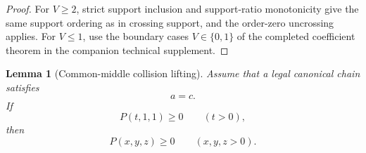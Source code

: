 \documentclass[11pt]{article}
\newtheorem{lemma}[theorem]{Lemma}
\theoremstyle{definition}
\begin{document}
\begin{proof}
For \(V\ge2\), strict support inclusion and support-ratio monotonicity give the same support ordering as in crossing support, and the order-zero uncrossing applies.  For \(V\le1\), use the boundary cases \(V\in\{0,1\}\) of the completed coefficient theorem in the companion technical supplement.
\end{proof}


\begin{lemma}[Common-middle collision lifting]
\label{lem:common-middle-lifting}
Assume that a legal canonical chain satisfies
\begin{equation*}
a=c.
\end{equation*}
If
\begin{equation*}
P(t,1,1)\ge0
\qquad(t>0),
\end{equation*}
then
\begin{equation*}
P(x,y,z)\ge0
\qquad(x,y,z>0).
\end{equation*}
\end{lemma}
\end{document}
